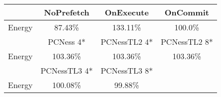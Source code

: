 \begin{tabular}{ l|ccc }
 & NoPrefetch & OnExecute & OnCommit\\ \hline
Energy
 & 87.43\% & 133.11\% & 100.0\%\\ \hline
\hline
 & PCNess 4* & PCNessTL2 4* & PCNessTL2 8*\\ \hline
Energy
 & 103.36\% & 103.36\% & 103.36\%\\ \hline
\hline
 & PCNessTL3 4* & PCNessTL3 8*&\\ \hline
Energy
 & 100.08\% & 99.88\%&\\ \hline
\end{tabular}

